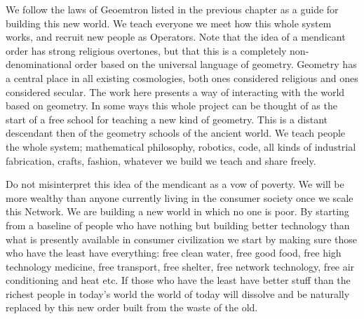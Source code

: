 We follow the laws of Geoemtron listed in the previous chapter as a
guide for building this new world. We teach everyone we meet how this
whole system works, and recruit new people as Operators. Note that the
idea of a mendicant order has strong religious overtones, but that this
is a completely non-denominational order based on the universal language
of geometry. Geometry has a central place in all existing cosmologies,
both ones considered religious and ones considered secular. The work
here presents a way of interacting with the world based on geometry. In
some ways this whole project can be thought of as the start of a free
school for teaching a new kind of geometry. This is a distant descendant
then of the geometry schools of the ancient world. We teach people the
whole system; mathematical philosophy, robotics, code, all kinds of
industrial fabrication, crafts, fashion, whatever we build we teach and
share freely.

Do not misinterpret this idea of the mendicant as a vow of poverty. We
will be more wealthy than anyone currently living in the consumer
society once we scale this Network. We are building a new world in which
no one is poor. By starting from a baseline of people who have nothing
but building better technology than what is presently available in
consumer civilization we start by making sure those who have the least
have everything: free clean water, free good food, free high technology
medicine, free transport, free shelter, free network technology, free
air conditioning and heat etc. If those who have the least have better
stuff than the richest people in today's world the world of today will
dissolve and be naturally replaced by this new order built from the
waste of the old.

